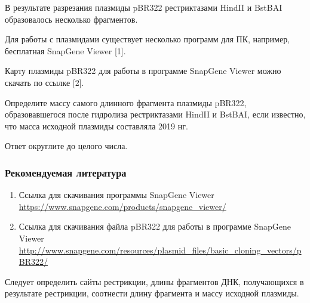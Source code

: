 
В результате разрезания плазмиды pBR322 рестриктазами HindII и BstBAI образовалось несколько фрагментов.

Для работы с плазмидами существует несколько программ для ПК, например, бесплатная SnapGene Viewer [1].

Карту плазмиды pBR322 для работы в программе SnapGene Viewer можно скачать по ссылке [2].

Определите массу самого длинного фрагмента плазмиды pBR322, образовавшегося после гидролиза рестриктазами HindII и BstBAI, если известно, что масса исходной плазмиды составляла 2019 нг.

Ответ округлите до целого числа. 


\subsubsection*{Рекомендуемая литература}

\begin{enumerate}
    \item Ссылка для скачивания программы SnapGene Viewer \url{https://www.snapgene.com/products/snapgene_viewer/}
    \item Ссылка для скачивания файла pBR322 для работы в программе SnapGene Viewer \url{http://www.snapgene.com/resources/plasmid_files/basic_cloning_vectors/pBR322/}
\end{enumerate}

\explanationSection

Следует определить сайты рестрикции, длины фрагментов ДНК, получающихся в результате рестрикции, соотнести длину фрагмента и массу исходной плазмиды. 

